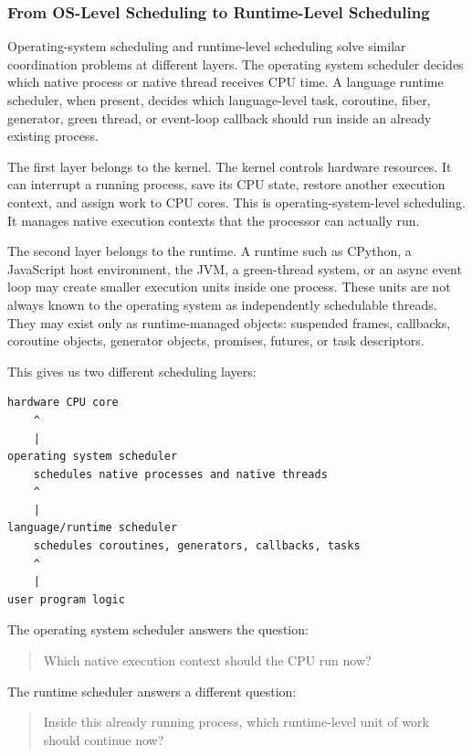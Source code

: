 \subsubsection{From OS-Level Scheduling to Runtime-Level Scheduling}

Operating-system scheduling and runtime-level scheduling solve similar coordination problems at different layers. The operating system scheduler decides which native process or native thread receives CPU time. A language runtime scheduler, when present, decides which language-level task, coroutine, fiber, generator, green thread, or event-loop callback should run inside an already existing process.

The first layer belongs to the kernel. The kernel controls hardware resources. It can interrupt a running process, save its CPU state, restore another execution context, and assign work to CPU cores. This is operating-system-level scheduling. It manages native execution contexts that the processor can actually run.

The second layer belongs to the runtime. A runtime such as CPython, a JavaScript host environment, the JVM, a green-thread system, or an async event loop may create smaller execution units inside one process. These units are not always known to the operating system as independently schedulable threads. They may exist only as runtime-managed objects: suspended frames, callbacks, coroutine objects, generator objects, promises, futures, or task descriptors.

This gives us two different scheduling layers:

\begin{verbatim}
hardware CPU core
    ^
    |
operating system scheduler
    schedules native processes and native threads
    ^
    |
language/runtime scheduler
    schedules coroutines, generators, callbacks, tasks
    ^
    |
user program logic
\end{verbatim}

The operating system scheduler answers the question:

\begin{quote}
Which native execution context should the CPU run now?
\end{quote}

The runtime scheduler answers a different question:

\begin{quote}
Inside this already running process, which runtime-level unit of work should continue now?
\end{quote}

